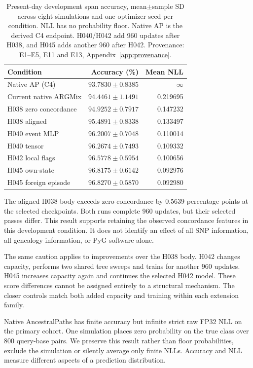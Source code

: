 \documentclass[letterpaper]{article}
\begin{document}
\begin{table}[t]
\centering
\small
\begin{tabular}{lrr}
\toprule
Condition & Accuracy (\%) & Mean NLL \\
\midrule
Native AP (C4) & $93.7830\pm0.8385$ & $\infty$ \\
Current native ARGMix & $94.4461\pm1.1491$ & 0.219695 \\
H038 zero concordance & $94.9252\pm0.7917$ & 0.147232 \\
H038 aligned & $95.4891\pm0.8338$ & 0.133497 \\
H040 event MLP & $96.2007\pm0.7048$ & 0.110014 \\
H040 tensor & $96.2674\pm0.7493$ & 0.109332 \\
H042 local flags & $96.5778\pm0.5954$ & 0.100656 \\
H045 own-state & $96.8175\pm0.6142$ & 0.092976 \\
H045 foreign episode & $96.8270\pm0.5870$ & 0.092980 \\
\bottomrule
\end{tabular}
\caption{Present-day development span accuracy, mean$\pm$sample SD across eight simulations and one optimizer seed per condition. NLL has no probability floor. Native AP is the derived C4 endpoint. H040/H042 add 960 updates after H038, and H045 adds another 960 after H042. Provenance: E1--E5, E11 and E13, Appendix~\ref{app:provenance}.}
\label{tab:primary}
\end{table}


The aligned H038 body exceeds zero concordance by 0.5639 percentage points at the selected checkpoints. Both runs complete 960 updates, but their selected passes differ. This result supports retaining the observed concordance features in this development condition. It does not identify an effect of all SNP information, all genealogy information, or PyG software alone.

The same caution applies to improvements over the H038 body. H042 changes capacity, performs two shared tree sweeps and trains for another 960 updates. H045 increases capacity again and continues the selected H042 model. These score differences cannot be assigned entirely to a structural mechanism. The closer controls match both added capacity and training within each extension family.

Native AncestralPaths has finite accuracy but infinite strict raw FP32 NLL on the primary cohort. One simulation places zero probability on the true class over 800 query-base pairs. We preserve this result rather than floor probabilities, exclude the simulation or silently average only finite NLLs. Accuracy and NLL measure different aspects of a prediction distribution.
\end{document}
